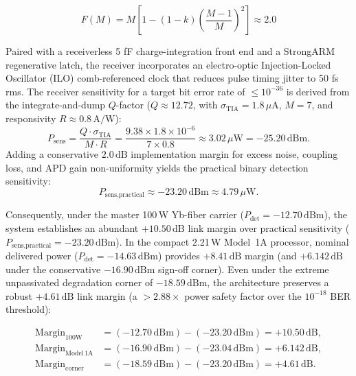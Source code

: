 \documentclass[journal]{IEEEtran}
\begin{document}
\begin{equation}
F(M) = M\left[1-(1-k)
\left(\frac{M-1}{M}\right)^2\right]
\approx 2.0
\end{equation}

Paired with a receiverless 5 fF charge-integration front end and a StrongARM regenerative latch, the receiver incorporates an electro-optic Injection-Locked Oscillator (ILO) comb-referenced clock that reduces pulse timing jitter to 50 fs rms. The receiver sensitivity for a target bit error rate of $\le 10^{-36}$ is derived from the integrate-and-dump $Q$-factor ($Q \approx 12.72$, with $\sigma_{\mathrm{TIA}} = 1.8\,\mu\mathrm{A}$, $M=7$, and responsivity $R \approx 0.8\,\mathrm{A/W}$):
\begin{equation}
P_{\mathrm{sens}} = \frac{Q \cdot \sigma_{\mathrm{TIA}}}{M \cdot R} = \frac{9.38 \times 1.8 \times 10^{-6}}{7 \times 0.8} \approx 3.02\,\mu\mathrm{W} = -25.20\,\mathrm{dBm}.
\end{equation}
Adding a conservative $2.0\,\mathrm{dB}$ implementation margin for excess noise, coupling loss, and APD gain non-uniformity yields the practical binary detection sensitivity:
\begin{equation}
P_{\text{sens,practical}} \approx -23.20\,\text{dBm} \approx 4.79\,\mu\mathrm{W}.
\end{equation}

Consequently, under the master 100\,W Yb-fiber carrier ($P_{\mathrm{det}} = -12.70\,\text{dBm}$), the system establishes an abundant $+10.50\,\text{dB}$ link margin over practical sensitivity ($P_{\text{sens,practical}} = -23.20\,\text{dBm}$). In the compact 2.21\,W Model~1A processor, nominal delivered power ($P_{\mathrm{det}} = -14.63\,\text{dBm}$) provides $+8.41\,\text{dB}$ margin (and $+6.142\,\text{dB}$ under the conservative $-16.90\,\text{dBm}$ sign-off corner). Even under the extreme unpassivated degradation corner of $-18.59\,\text{dBm}$, the architecture preserves a robust $+4.61\,\text{dB}$ link margin (a $> 2.88\times$ power safety factor over the $10^{-18}$ BER threshold):

\begin{equation}
\begin{aligned}
\mathrm{Margin}_{\mathrm{100W}} &= (-12.70\,\mathrm{dBm}) - (-23.20\,\mathrm{dBm}) = +10.50\,\mathrm{dB}, \\
\mathrm{Margin}_{\mathrm{Model\,1A}} &= (-16.90\,\mathrm{dBm}) - (-23.04\,\mathrm{dBm}) = +6.142\,\mathrm{dB}, \\
\mathrm{Margin}_{\mathrm{corner}} &= (-18.59\,\mathrm{dBm}) - (-23.20\,\mathrm{dBm}) = +4.61\,\mathrm{dB}.
\end{aligned}
\end{equation}
\end{document}
